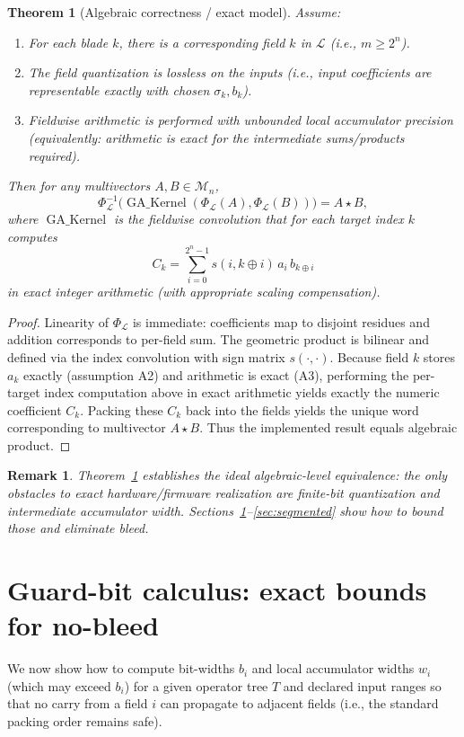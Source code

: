\documentclass[11pt]{article}
\theoremstyle{definition}
\theoremstyle{plain}
\newtheorem{theorem}{Theorem}[section]
\newtheorem{remark}{Remark}[section]
\begin{document}
\begin{theorem}[Algebraic correctness / exact model]\label{thm:isomorphism}
Assume:
\begin{enumerate}[label=(A\arabic*)]
  \item For each blade \(k\), there is a corresponding field \(k\) in \(\mathcal{L}\) (i.e., \(m\ge 2^n\)).
  \item The field quantization is lossless on the inputs (i.e., input coefficients are representable exactly with chosen \(\sigma_k,b_k\)).
  \item Fieldwise arithmetic is performed with unbounded local accumulator precision (equivalently: arithmetic is exact for the intermediate sums/products required).
\end{enumerate}
Then for any multivectors \(A,B\in\mathcal{M}_n\),
\[
\Phi_{\mathcal{L}}^{-1}\big( \operatorname{GA\_Kernel}(\Phi_{\mathcal{L}}(A),\Phi_{\mathcal{L}}(B)) \big)
= A \star B,
\]
where \(\operatorname{GA\_Kernel}\) is the fieldwise convolution that for each target index \(k\) computes
\[
C_k = \sum_{i=0}^{2^n-1} s(i,k\oplus i)\, a_i \, b_{k\oplus i}
\]
in exact integer arithmetic (with appropriate scaling compensation).
\end{theorem}

\begin{proof}
Linearity of \(\Phi_{\mathcal{L}}\) is immediate: coefficients map to disjoint residues and addition corresponds to per-field sum. The geometric product is bilinear and defined via the index convolution with sign matrix \(s(\cdot,\cdot)\). Because field \(k\) stores \(a_k\) exactly (assumption A2) and arithmetic is exact (A3), performing the per-target index computation above in exact arithmetic yields exactly the numeric coefficient \(C_k\). Packing these \(C_k\) back into the fields yields the unique word corresponding to multivector \(A\star B\). Thus the implemented result equals algebraic product.
\end{proof}

\begin{remark}
Theorem~\ref{thm:isomorphism} establishes the ideal \emph{algebraic-level} equivalence: the only obstacles to exact hardware/firmware realization are finite-bit quantization and intermediate accumulator width. Sections~\ref{sec:guardcalc}--\ref{sec:segmented} show how to bound those and eliminate bleed.
\end{remark}

\section{Guard-bit calculus: exact bounds for no-bleed}
\label{sec:guardcalc}
We now show how to compute bit-widths \(b_i\) and local accumulator widths \(w_i\) (which may exceed \(b_i\)) for a given operator tree \(T\) and declared input ranges so that no carry from a field \(i\) can propagate to adjacent fields (i.e., the standard packing order remains safe).
\end{document}
